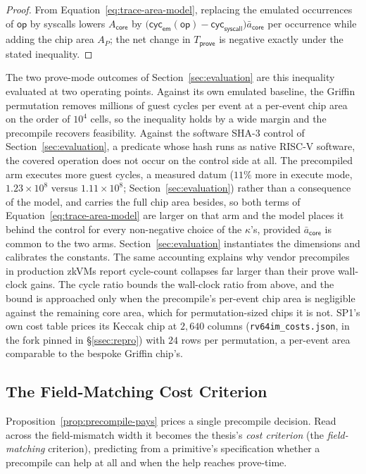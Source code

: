 \begin{proof}
From Equation~\eqref{eq:trace-area-model}, replacing the emulated occurrences of $\mathsf{op}$ by syscalls lowers $A_{\mathsf{core}}$ by $\bigl(\mathsf{cyc}_{\mathsf{em}}(\mathsf{op}) - \mathsf{cyc}_{\mathsf{syscall}}\bigr)\bar a_{\mathsf{core}}$ per occurrence while adding the chip area $A_P$; the net change in $T_{\mathsf{prove}}$ is negative exactly under the stated inequality.
\end{proof} The two prove-mode outcomes of Section~\ref{sec:evaluation} are this inequality evaluated at two operating points. Against its own emulated baseline, the Griffin permutation removes millions of guest cycles per event at a per-event chip area on the order of $10^{4}$ cells, so the inequality holds by a wide margin and the precompile recovers feasibility. Against the software SHA-3 control of Section~\ref{sec:evaluation}, a predicate whose hash runs as native RISC-V software, the covered operation does not occur on the control side at all. The precompiled arm executes more guest cycles, a measured datum ($11\%$ more in execute mode, $1.23\times10^{8}$ versus $1.11\times10^{8}$; Section~\ref{sec:evaluation}) rather than a consequence of the model, and carries the full chip area besides, so both terms of Equation~\eqref{eq:trace-area-model} are larger on that arm and the model places it behind the control for every non-negative choice of the $\kappa$'s, provided $\bar a_{\mathsf{core}}$ is common to the two arms. Section~\ref{sec:evaluation} instantiates the dimensions and calibrates the constants. The same accounting explains why vendor precompiles in production zkVMs report cycle-count collapses far larger than their prove wall-clock gains. The cycle ratio bounds the wall-clock ratio from above, and the bound is approached only when the precompile's per-event chip area is negligible against the remaining core area, which for permutation-sized chips it is not. SP1's own cost table prices its Keccak chip at $2{,}640$ columns (\texttt{rv64im\_costs.json}, in the fork pinned in \S\ref{ssec:repro}) with $24$ rows per permutation, a per-event area comparable to the bespoke Griffin chip's.

\subsection{The Field-Matching Cost Criterion}\label{ssec:criterion}
Proposition~\ref{prop:precompile-pays} prices a single precompile decision. Read across the field-mismatch width it becomes the thesis's \emph{cost criterion} (the \emph{field-matching} criterion), predicting from a primitive's specification whether a precompile can help at all and when the help reaches prove-time.

